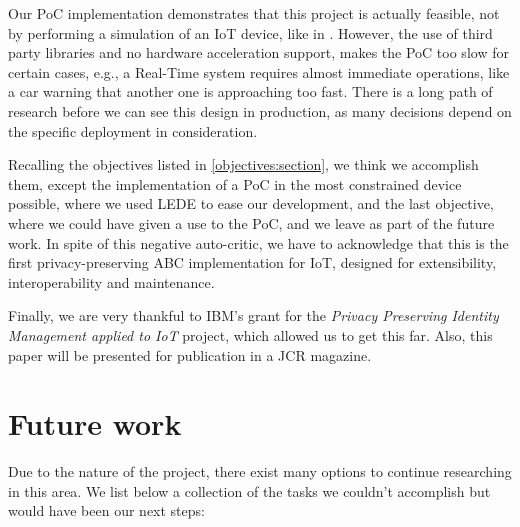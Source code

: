 Our PoC implementation demonstrates that this project is actually feasible, not by performing a simulation of an IoT device, like in \citep{vanet}. However, the use of third party libraries and no hardware acceleration support, makes the PoC too slow for certain cases, e.g., a Real-Time system requires almost immediate operations, like a car warning that another one is approaching too fast.
There is a long path of research before we can see this design in production, as many decisions depend on the specific deployment in consideration.


Recalling the objectives listed in \autoref{objectives:section}, we think we accomplish them, except the implementation of a PoC in the most constrained device possible, where we used LEDE to ease our development, and the last objective, where we could have given a use to the PoC, and we leave as part of the future work. In spite of this negative auto-critic, we have to acknowledge that this is the first privacy-preserving ABC implementation for IoT, designed for extensibility, interoperability and maintenance.

Finally, we are very thankful to IBM's grant for the \textit{Privacy Preserving Identity Management applied to IoT} project, which allowed us to get this far. Also, this paper will be presented for publication in a JCR magazine.


\section{Future work}


Due to the nature of the project, there exist many options to continue researching in this area. We list below a collection of the tasks we couldn't accomplish but would have been our next steps:

